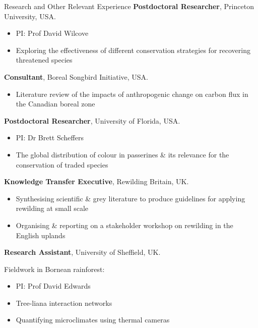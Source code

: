 \renewcommand\labelitemi{$\diamond$}

\begin{rubric}{Research and Other Relevant Experience}
%
	\textbf{Postdoctoral Researcher}, Princeton University, USA.
	\begin{itemize}[topsep=0pt,itemsep=-1ex,partopsep=1ex,parsep=1ex]
	\item PI: Prof David Wilcove
	\item Exploring the effectiveness of different conservation strategies for recovering threatened species
	\end{itemize}
\entry*[2020]%
	\textbf{Consultant}, Boreal Songbird Initiative, USA.
	\begin{itemize}[topsep=0pt,itemsep=-1ex,partopsep=1ex,parsep=1ex]
	\item Literature review of the impacts of anthropogenic change on carbon flux in the Canadian boreal zone
	\end{itemize}
\entry*[2019]%
	\textbf{Postdoctoral Researcher}, University of Florida, USA.
	\begin{itemize}[topsep=0pt,itemsep=-1ex,partopsep=1ex,parsep=1ex]
	\item PI: Dr Brett Scheffers
	\item The global distribution of colour in passerines \& its relevance for the conservation of traded species
	\end{itemize}
\entry*[2016]%
	\textbf{Knowledge Transfer Executive}, Rewilding Britain, UK.
	\begin{itemize}[topsep=0pt,itemsep=-1ex,partopsep=1ex,parsep=1ex]
	\item Synthesising scientific \& grey literature to produce guidelines for applying rewilding at small scale
	\item Organising \& reporting on a stakeholder workshop on rewilding in the English uplands \parencite{sandom_rewilding_2019}
	\end{itemize}
\entry*[2014]%
	\textbf{Research Assistant}, University of Sheffield, UK.
	\par Fieldwork in Bornean rainforest:
	\begin{itemize}[topsep=0pt,itemsep=-1ex,partopsep=1ex,parsep=1ex]
	\item PI: Prof David Edwards
	\item Tree-liana interaction networks \parencite{magrach_selective_2016}
	\item Quantifying microclimates using thermal cameras \parencite{scheffers_extreme_2017}

\end{itemize}
\end{rubric}
